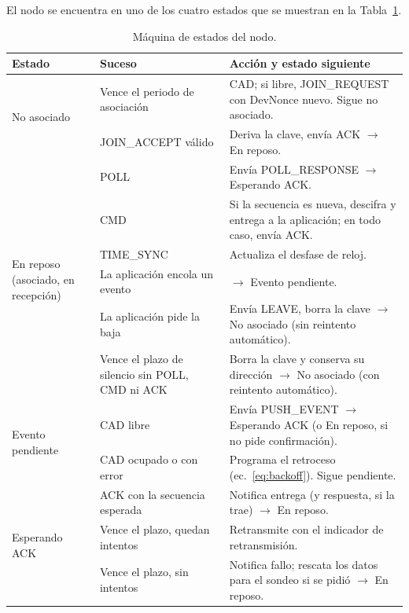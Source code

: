 El nodo se encuentra en uno de los cuatro estados que se muestran en la Tabla~\ref{tab:fsm-nodo}.

\begin{table}[H]
\centering
\caption{\label{tab:fsm-nodo} Máquina de estados del nodo.}
\begin{tabular}{|p{2.9cm}|p{4.7cm}|p{6.0cm}|}
\hline
\textbf{Estado} & \textbf{Suceso} & \textbf{Acción y estado siguiente} \\
\hline
\multirow{2}{2.9cm}{No asociado}
 & Vence el periodo de asociación & CAD; si libre, JOIN\_REQUEST con DevNonce nuevo. Sigue no asociado. \\
\cline{2-3}
 & JOIN\_ACCEPT válido & Deriva la clave, envía ACK $\rightarrow$ En reposo. \\
\hline
\multirow{6}{2.9cm}{En reposo (asociado, en recepción)}
 & POLL & Envía POLL\_RESPONSE $\rightarrow$ Esperando ACK. \\
\cline{2-3}
 & CMD & Si la secuencia es nueva, descifra y entrega a la aplicación; en todo caso, envía ACK. \\
 \cline{2-3}
 & TIME\_SYNC & Actualiza el desfase de reloj. \\
\cline{2-3}
 & La aplicación encola un evento & $\rightarrow$ Evento pendiente. \\
\cline{2-3}
 & La aplicación pide la baja & Envía LEAVE, borra la clave $\rightarrow$ No asociado (sin reintento automático). \\
\cline{2-3}
 & Vence el plazo de silencio sin POLL, CMD ni ACK & Borra la clave y conserva su dirección $\rightarrow$ No asociado (con reintento automático). \\
\hline
\multirow{2}{2.9cm}{Evento pendiente}
 & CAD libre & Envía PUSH\_EVENT $\rightarrow$ Esperando ACK (o En reposo, si no pide confirmación). \\
\cline{2-3}
 & CAD ocupado o con error & Programa el retroceso (ec.~\ref{eq:backoff}). Sigue pendiente. \\
\hline
\multirow{3}{2.9cm}{Esperando ACK}
 & ACK con la secuencia esperada & Notifica entrega (y respuesta, si la trae) $\rightarrow$ En reposo. \\
\cline{2-3}
 & Vence el plazo, quedan intentos & Retransmite con el indicador de retransmisión. \\
\cline{2-3}
 & Vence el plazo, sin intentos & Notifica fallo; rescata los datos para el sondeo si se pidió $\rightarrow$ En reposo. \\
\hline
\end{tabular}
\end{table}

